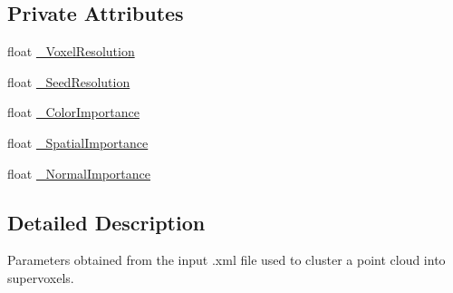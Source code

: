 \subsection*{Private Attributes}
\begin{DoxyCompactItemize}
\item 
float \hyperlink{classSupervoxelClusteringParameters_acb807a5e20b4d12322c974b005f72826}{\-\_\-\-Voxel\-Resolution}
\item 
float \hyperlink{classSupervoxelClusteringParameters_ac730f744c64437c9e9730f64fcb963a4}{\-\_\-\-Seed\-Resolution}
\item 
float \hyperlink{classSupervoxelClusteringParameters_ab6ce7a2aab4ae4cfcb7f784cd718a9b9}{\-\_\-\-Color\-Importance}
\item 
float \hyperlink{classSupervoxelClusteringParameters_a531585249d452c5db7e498d865e9770b}{\-\_\-\-Spatial\-Importance}
\item 
float \hyperlink{classSupervoxelClusteringParameters_a50547858e39be08fbe51c51a4a6aedc0}{\-\_\-\-Normal\-Importance}
\end{DoxyCompactItemize}


\subsection{Detailed Description}
Parameters obtained from the input .xml file used to cluster a point cloud into supervoxels. 

